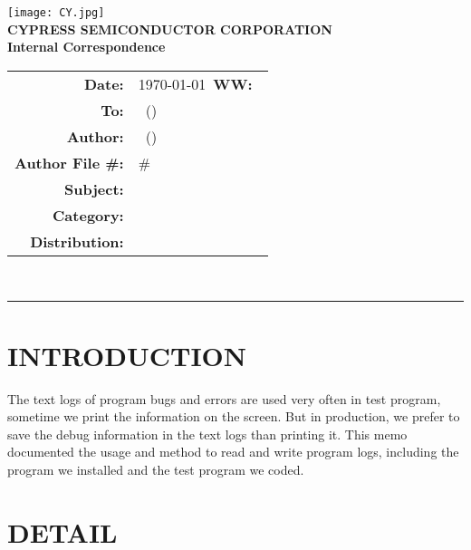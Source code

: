 \documentclass{article}
\renewcommand{\maketitle}
{
    \begin{center}
    \texttt{[image: CY.jpg]}\\
    \vspace{5 mm}
    \large
    {
    \textbf{CYPRESS SEMICONDUCTOR CORPORATION}\\
    \textbf{Internal Correspondence}\\
    }
    \vspace{1 mm}
    \hspace{0.5 in}
    \begin{tabular}{rl}
    \bf Date: & \today\ \hspace{2 in}\textbf{WW:\ }\WorkWeek\\
    \bf To: & \BossName\ (\BossInitials)\\
    \bf Author: & \Author\ (\AuthorInitials)\\
    \bf Author File \#: & \AuthorInitials\#\MemoNumber\\
    \bf Subject: & \Subject\\
    \bf Category: & \Category\\
    \bf Distribution: & \Distribution\\
    \end{tabular}
    \vspace{3 mm}\\
    \hrule
    \end{center}
    
    \thispagestyle{firstpage}
    \pagestyle{normalpage}
}
\begin{document}
\maketitle

\section{INTRODUCTION}
The text logs of program bugs and errors are used very often in test program, sometime we print the information on the screen.
But in production, we prefer to save the debug information in the text logs than printing it.
This memo documented the usage and method to read and write program logs, including the program we installed and the test program we coded.

\section{DETAIL}
\end{document}
